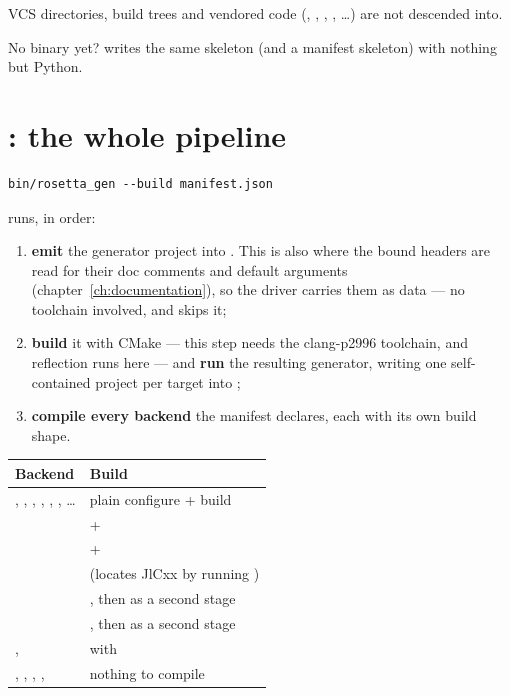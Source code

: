 VCS directories, build trees and vendored code (, ,
, , \ldots) are not descended into.

\begin{note}
No  binary yet?  writes the
same skeleton (and a manifest skeleton) with nothing but Python.
\end{note}

\section{: the whole pipeline}

\begin{lstlisting}[style=sh]
bin/rosetta_gen --build manifest.json
\end{lstlisting}

runs, in order:

\begin{enumerate}
  \item \textbf{emit} the generator project into .
    This is also where the bound headers are read for their doc comments and
    default arguments (chapter~\ref{ch:documentation}), so the driver carries
    them as data --- no toolchain involved, and 
     skips it;
  \item \textbf{build} it with CMake --- this step needs the clang-p2996
    toolchain, and reflection runs here --- and \textbf{run} the resulting
    generator, writing one self-contained project per target into
    ;
  \item \textbf{compile every backend} the manifest declares, each with its own
    build shape.
\end{enumerate}

\begin{center}
\small
\begin{tabular}{@{}L{6.6cm}L{6.4cm}@{}}
\toprule
\textbf{Backend} & \textbf{Build} \\
\midrule
{}, , , , ,
  , \ldots & plain  configure + build \\
   &  +  \\
   &  +  \\
  &  (locates JlCxx by running ) \\
 & , then  as a second stage \\
   & , then  as a second stage \\
,  &  with  \\
, , , ,
   & nothing to compile \\
\bottomrule
\end{tabular}
\end{center}

